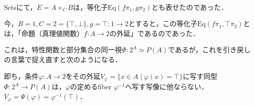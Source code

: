\documentclass[uplatex, 12pt, dvipdfmx]{jsarticle}
\begin{document}
\begin{example}　

    \begin{center}
    \end{center}
    Setsにて，$E=A\times_CB$は，等化子$\mathrm{Eq}(f\pi_1,g\pi_2)$とも表せたのであった．
    \begin{center}
    \end{center}
    今，$B=1,C=2=\{\top,\bot\},g=\top:1\to 2$とすると，この等化子$\mathrm{Eq}(f\pi_1,\top\pi_2)$とは，「命題（真理値関数）$f:A\to 2$の外延」であるのであった．
    \begin{center}
    \end{center}
    これは，特性関数と部分集合の同一視$\Phi:2^A\simeq P(A)$であるが，これを引き戻しの言葉で捉え直すと次のようになる．
    \begin{center}
    \end{center}
    即ち，条件$\varphi:A\to 2$をその外延$V_\varphi=\{x\in A\mid \varphi(x)=\top\}$に写す同型$\Phi:2^A\to P(A)$は，$\varphi$の定めるfiber $\varphi^{-1}$へ写す写像に他ならない．$V_\varphi = \Psi(\varphi) = \varphi^{-1}(\top)$．


\end{example}
\end{document}

